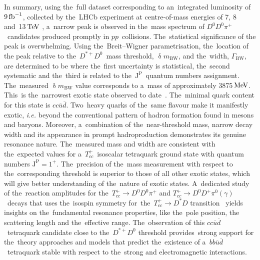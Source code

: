 \documentclass[12pt,a4paper]{article}
\def\lhcb   {\mbox{LHCb}\xspace}
\def\Pgamma      {\ensuremath{\upgamma}\xspace}
\def\Ppi         {\ensuremath{\uppi}\xspace}
\def\PD      {\ensuremath{\mathrm{D}}\xspace}
\def\PT      {\ensuremath{\mathrm{T}}\xspace}
\def\Pb      {\ensuremath{\mathrm{b}}\xspace}
\def\Pc      {\ensuremath{\mathrm{c}}\xspace}
\def\Pd      {\ensuremath{\mathrm{d}}\xspace}
\def\Pp      {\ensuremath{\mathrm{p}}\xspace}
\def\Pu      {\ensuremath{\mathrm{u}}\xspace}
\def\Pgamma      {\ensuremath{\gamma}\xspace}
\def\Ppi         {\ensuremath{\pi}\xspace}
\def\PD      {\ensuremath{D}\xspace}
\def\PT      {\ensuremath{T}\xspace}
\def\Pb      {\ensuremath{b}\xspace}
\def\Pc      {\ensuremath{c}\xspace}
\def\Pd      {\ensuremath{d}\xspace}
\def\Pp      {\ensuremath{p}\xspace}
\def\Pu      {\ensuremath{u}\xspace}
\def\g      {{\ensuremath{\Pgamma}}\xspace}
\def\uquark    {{\ensuremath{\Pu}}\xspace}
\def\uquarkbar {{\ensuremath{\overline \uquark}}\xspace}
\def\dquark    {{\ensuremath{\Pd}}\xspace}
\def\dquarkbar {{\ensuremath{\overline \dquark}}\xspace}
\def\cquark    {{\ensuremath{\Pc}}\xspace}
\def\bquark    {{\ensuremath{\Pb}}\xspace}
\def\pion   {{\ensuremath{\Ppi}}\xspace}
\def\piz    {{\ensuremath{\pion^0}}\xspace}
\def\pip    {{\ensuremath{\pion^+}}\xspace}
\def\D       {{\ensuremath{\PD}}\xspace}
\def\Dz      {{\ensuremath{\D^0}}\xspace}
\def\Dp      {{\ensuremath{\D^+}}\xspace}
\def\Dstar   {{\ensuremath{\D^*}}\xspace}
\def\Dstarp  {{\ensuremath{\D^{*+}}}\xspace}
\def\proton      {{\ensuremath{\Pp}}\xspace}
\newcommand{\decay}[2]{\ensuremath{#1\!\to #2}\xspace}
\def\to                 {\ensuremath{\rightarrow}\xspace}
\newcommand{\aunit}[1]{\ensuremath{\text{\,#1}}}
\newcommand{\tev}{\aunit{Te\kern -0.1em V}\xspace}
\newcommand{\mev}{\aunit{Me\kern -0.1em V}\xspace}
\newcommand{\kev}{\aunit{ke\kern -0.1em V}\xspace}
\def\fb   {\ensuremath{\aunit{fb}}\xspace}
\def\invfb   {\ensuremath{\fb^{-1}}\xspace}
\newcommand{\ie}{\mbox{\itshape i.e.}\xspace}
\def\Tcc {{{\ensuremath{\PT_{\cquark\cquark}^+}}}\xspace}
\newcommand{\kevcc}{\ensuremath{\aunit{ke\kern -0.1em V\!/}c^2}\xspace}
\begin{document}
In summary,  using the~full
dataset corresponding to an~integrated 
luminosity 
of $9\invfb$,
collected by the~\lhcb experiment 
at centre-of-mass energies of 7, 8 and~13\tev
, 
a~narrow peak is observed 
in the~mass spectrum of $\Dz\Dz\pip$~candidates 
produced promptly in $\proton\proton$~collisions.
The~statistical significance of the peak 
is overwhelming. 
Using the~Breit\nobreakdash--Wigner 
parametrisation, 
the~location of the peak 
relative to the~$\Dstarp\Dz$~mass threshold,
$\updelta m_{\mathrm{BW}}$,
and the~width, $\Gamma_{\mathrm{BW}}$, 
are determined to be 
\ifthenelse{\boolean{wordcount}}{}{
\begin{eqnarray*}
\updelta m_{\mathrm{BW}} 
& = &  
-273\pm \phantom{0}61 
\pm \phantom{0}5\,  {}^{\,+\,11}_{\,-\,14} \kevcc \,,
\\
\Gamma_{\mathrm{BW}} 
& = & 
\phantom{-} 410 \pm 165 \pm  43\,   {}^{\,+\,18}_{\,-\,38}\kev\,,
\end{eqnarray*}
}
where the~first uncertainty is statistical, 
the~second systematic 
and the~third is related 
to the~$\mathrm{J^P}$~quantum numbers  assignment.
The~measured $\updelta m_{\mathrm{BW}}$  
value corresponds 
to a~mass of approximately 3875\mev.
This~is the~narrowest exotic state 
observed to date~\cite{Brambilla:2019esw,
PDG2021}.
The~minimal quark content 
for this
state is $\cquark\cquark\uquarkbar\dquarkbar$.
Two~heavy quarks of the~same 
flavour make it manifestly exotic, 
\ie beyond the conventional pattern
of hadron formation found in mesons and baryons.
Moreover, 
a~combination of the~near\nobreakdash-threshold mass,
narrow decay width and 
its appearance in prompt hadroproduction
demonstrates its genuine resonance nature.
The~measured mass and width are consistent with 
the~expected values for a~\Tcc~isoscalar 
tetraquark ground state with 
quantum numbers $\mathrm{J}^{\mathrm{P}}=1^+$. The~precision of the~mass measurement 
with respect to the~corresponding threshold 
is superior to those of all other exotic states, 
which will give better understanding of 
the~nature of exotic states. A~dedicated study of the~reaction amplitudes
for the~\mbox{$\decay{\Tcc}{\Dz\Dz\pip}$} and
\mbox{$\decay{\Tcc}{\Dz\Dp\piz(\g)}$}~decays
that uses the~isospin 
symmetry for~the~\mbox{$\decay{\Tcc}{\Dstar\D}$}
transition~\cite{LHCb-PAPER-2021-032}
yields insights on
the~fundamental resonance properties, 
like the~pole position, 
the scattering length and the~effective range.
The~observation of 
this $\cquark\cquark\uquarkbar\dquarkbar$~tetraquark 
candidate 
close to the~$\Dstarp\Dz$ threshold 
provides~strong support 
for the~theory approaches and models 
that predict 
the~existence 
of a~$\bquark\bquark\uquarkbar\dquarkbar$~tetraquark 
stable with respect to the~strong and 
electromagnetic interactions.
 
\end{document}
